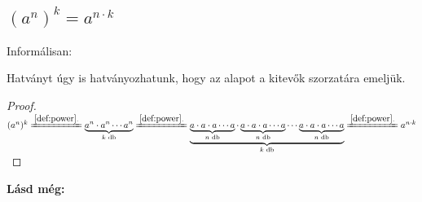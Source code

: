 \subsection{\texorpdfstring{$(a^n)^k = a^{n \cdot k}$}{(a**n)**k = a**(n * k)}}
Informálisan:

Hatványt úgy is hatványozhatunk, hogy az alapot a kitevők szorzatára emeljük.

\begin{proof}

$(a^n)^k
 \xlongequal{\ref{def:power}.}
 \underbrace{a^n \cdot a^n \dotsm a^n}_{k \text{ db}} 
 \xlongequal{\ref{def:power}.}
 \underbrace{\underbrace{a \cdot a \cdot a \dotsm a}_{n \text{ db}}
   \cdot \underbrace{a \cdot a \cdot a \dotsm a}_{n \text{ db}} \dotsm
   \underbrace{a \cdot a \cdot a \dotsm a}_{n \text{ db}}}_{k \text{ db}}
 \xlongequal{\ref{def:power}.} a^{n \cdot k}
$
\end{proof}

\textbf{Lásd még:}
